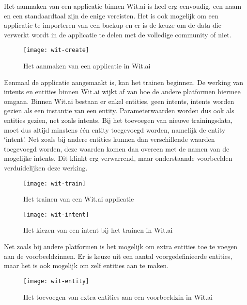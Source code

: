 Het aanmaken van een applicatie binnen Wit.ai is heel erg eenvoudig, een naam en een standaardtaal zijn de enige vereisten. Het is ook mogelijk om een applicatie te importeren van een backup en er is de keuze om de data die verwerkt wordt in de applicatie te delen met de volledige community of niet.

\begin{figure}[H]
    \label{fig:wit-create}
    \centering
    \texttt{[image: wit-create]}
    \caption{Het aanmaken van een applicatie in Wit.ai}
\end{figure}

Eenmaal de applicatie aangemaakt is, kan het trainen beginnen. De werking van intents en entities binnen Wit.ai wijkt af van hoe de andere platformen hiermee omgaan. Binnen Wit.ai bestaan er enkel entities, geen intents, intents worden gezien als een instantie van een entity. Parameterwaarden worden dus ook als entities gezien, net zoals intents. Bij het toevoegen van nieuwe trainingsdata, moet dus altijd minstens één entity toegevoegd worden, namelijk de entity ‘intent’. Net zoals bij andere entities kunnen dan verschillende waarden toegevoegd worden, deze waarden komen dan overeen met de namen van de mogelijke intents. Dit klinkt erg verwarrend, maar onderstaande voorbeelden verduidelijken deze werking.

\begin{figure}[H]
    \label{fig:wit-train}
    \centering
    \texttt{[image: wit-train]}
    \caption{Het trainen van een Wit.ai applicatie}
\end{figure}

\begin{figure}[H]
    \label{fig:wit-intent}
    \centering
    \texttt{[image: wit-intent]}
    \caption{Het kiezen van een intent bij het trainen in Wit.ai}
\end{figure}

Net zoals bij andere platformen is het mogelijk om extra entities toe te voegen aan de voorbeeldzinnen. Er is keuze uit een aantal voorgedefinieerde entities, maar het is ook mogelijk om zelf entities aan te maken.

\begin{figure}[H]
    \label{fig:wit-entity}
    \centering
    \texttt{[image: wit-entity]}
    \caption{Het toevoegen van extra entities aan een voorbeeldzin in Wit.ai}
\end{figure}

